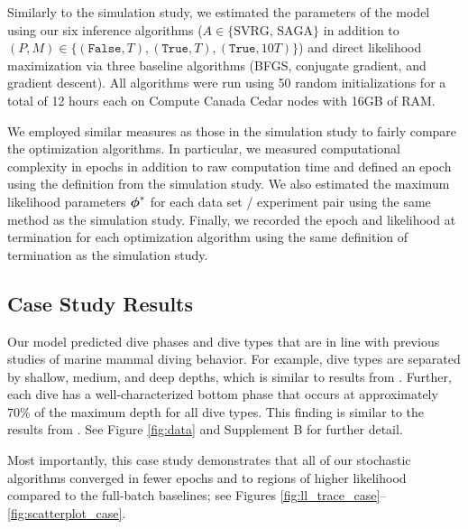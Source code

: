 Similarly to the simulation study, we estimated the parameters of the model using our six inference algorithms ($A \in \{\text{SVRG, SAGA}\}$ in addition to $(P,M) \in \{(\texttt{False},T), (\texttt{True},T), (\texttt{True},10T)\}$) and direct likelihood maximization via three baseline algorithms (BFGS, conjugate gradient, and gradient descent). All algorithms were run using 50 random initializations for a total of 12 hours each on Compute Canada Cedar nodes with 16GB of RAM.

We employed similar measures as those in the simulation study to fairly compare the optimization algorithms. In particular, we measured computational complexity in epochs in addition to raw computation time and defined an epoch using the definition from the simulation study. We also estimated the maximum likelihood parameters $\boldsymbol{\phi}^*$ for each data set / experiment pair using the same method as the simulation study. Finally, we recorded the epoch and likelihood at termination for each optimization algorithm using the same definition of termination as the simulation study.

\subsection{Case Study Results}

Our model predicted dive phases and dive types that are in line with previous studies of marine mammal diving behavior. For example, dive types are separated by shallow, medium, and deep depths, which is similar to results from \citet{Barajas:2017}. Further, each dive has a well-characterized bottom phase that occurs at approximately 70\% of the maximum depth for all dive types. This finding is similar to the results from \citet{Tennessen:2019a}. See Figure \ref{fig:data} and Supplement B for further detail.

Most importantly, this case study demonstrates that all of our stochastic algorithms converged in fewer epochs and to regions of higher likelihood compared to the full-batch baselines; see Figures \ref{fig:ll_trace_case}--\ref{fig:scatterplot_case}.


